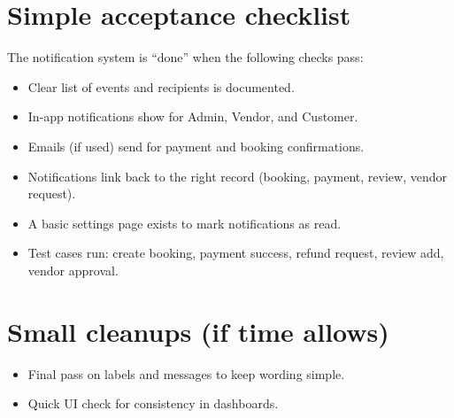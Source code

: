 \section{Simple acceptance checklist}
The notification system is “done” when the following checks pass:
\begin{itemize}
  \item Clear list of events and recipients is documented.
  \item In-app notifications show for Admin, Vendor, and Customer.
  \item Emails (if used) send for payment and booking confirmations.
  \item Notifications link back to the right record (booking, payment, review, vendor request).
  \item A basic settings page exists to mark notifications as read.
  \item Test cases run: create booking, payment success, refund request, review add, vendor approval.
\end{itemize}

\section{Small cleanups (if time allows)}
\begin{itemize}
  \item Final pass on labels and messages to keep wording simple.
  \item Quick UI check for consistency in dashboards.
\end{itemize}



